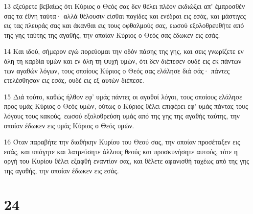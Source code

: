 \par 13 εξεύρετε βεβαίως ότι Κύριος ο Θεός σας δεν θέλει πλέον εκδιώξει απ' έμπροσθέν σας τα έθνη ταύτα· αλλά θέλουσιν είσθαι παγίδες και ενέδραι εις εσάς, και μάστιγες εις τας πλευράς σας και άκανθαι εις τους οφθαλμούς σας, εωσού εξολοθρευθήτε από της γης ταύτης της αγαθής, την οποίαν Κύριος ο Θεός σας έδωκεν εις εσάς.
\par 14 Και ιδού, σήμερον εγώ πορεύομαι την οδόν πάσης της γης, και σεις γνωρίζετε εν όλη τη καρδία υμών και εν όλη τη ψυχή υμών, ότι δεν διέπεσεν ουδέ εις εκ πάντων των αγαθών λόγων, τους οποίους Κύριος ο Θεός σας ελάλησε διά σάς· πάντες ετελέσθησαν εις εσάς, ουδέ εις εξ αυτών διέπεσε.
\par 15 Διά τούτο, καθώς ήλθον εφ' υμάς πάντες οι αγαθοί λόγοι, τους οποίους ελάλησε προς υμάς Κύριος ο Θεός υμών, ούτως ο Κύριος θέλει επιφέρει εφ' υμάς πάντας τους λόγους τους κακούς, εωσού εξολοθρεύση υμάς από της γης της αγαθής ταύτης, την οποίαν έδωκεν εις υμάς Κύριος ο Θεός υμών.
\par 16 Όταν παραβήτε την διαθήκην Κυρίου του Θεού σας, την οποίαν προσέταξεν εις εσάς, και υπάγητε και λατρεύσητε άλλους θεούς και προσκυνήσητε αυτούς, τότε η οργή του Κυρίου θέλει εξαφθή εναντίον σας, και θέλετε αφανισθή ταχέως από της γης της αγαθής, την οποίαν έδωκεν εις εσάς.

\chapter{24}

